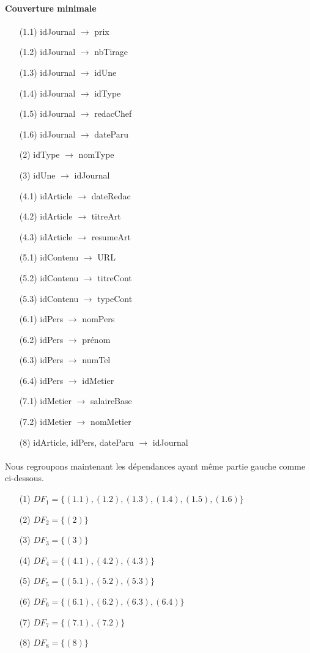 \paragraph{Couverture minimale}{
\begin{enumerate}
    \item[(1.1)] idJournal $\rightarrow$ prix
    \item[(1.2)] idJournal $\rightarrow$ nbTirage
    \item[(1.3)] idJournal $\rightarrow$ idUne
    \item[(1.4)] idJournal $\rightarrow$ idType
    \item[(1.5)] idJournal $\rightarrow$ redacChef
    \item[(1.6)] idJournal $\rightarrow$ dateParu
    \item[(2)] idType $\rightarrow$ nomType
    \item[(3)] idUne $\rightarrow$ idJournal
    \item[(4.1)] idArticle $\rightarrow$ dateRedac
    \item[(4.2)] idArticle $\rightarrow$ titreArt
    \item[(4.3)] idArticle $\rightarrow$ resumeArt
    \item[(5.1)] idContenu $\rightarrow$ URL
    \item[(5.2)] idContenu $\rightarrow$ titreCont
    \item[(5.3)] idContenu $\rightarrow$ typeCont
    \item[(6.1)] idPers $\rightarrow$ nomPers
    \item[(6.2)] idPers $\rightarrow$ prénom
    \item[(6.3)] idPers $\rightarrow$ numTel
    \item[(6.4)] idPers $\rightarrow$ idMetier
    \item[(7.1)] idMetier $\rightarrow$ salaireBase
    \item[(7.2)] idMetier $\rightarrow$ nomMetier
    \item[(8)] idArticle, idPers, dateParu $\rightarrow$ idJournal
\end{enumerate}}

\paragraph{}{
    Nous regroupons maintenant les dépendances ayant même partie gauche comme ci-dessous.
}
\begin{enumerate}
    \item[(1)] $DF_{1} = \{ (1.1), (1.2), (1.3), (1.4), (1.5), (1.6) \}$
    \item[(2)] $DF_{2} = \{ (2) \}$
    \item[(3)] $DF_{3} = \{ (3) \}$
    \item[(4)] $DF_{4} = \{ (4.1), (4.2), (4.3) \}$
    \item[(5)] $DF_{5} = \{ (5.1), (5.2), (5.3) \}$
    \item[(6)] $DF_{6} = \{ (6.1), (6.2), (6.3), (6.4) \}$
    \item[(7)] $DF_{7} = \{ (7.1), (7.2) \}$
    \item[(8)] $DF_{8} = \{ (8) \}$
\end{enumerate}

